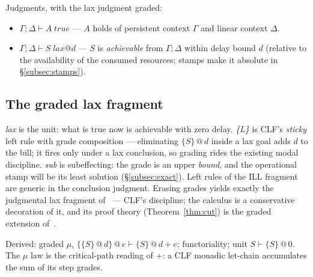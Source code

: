 \documentclass[11pt]{article}
\makeatletter
\newcommand{\lax}[2]{\{#1\}\mathbin{@}#2}       %
\newcommand{\tr}{\;\mathit{true}}                %
\newcommand{\laxjdg}[1]{\;\mathit{lax}@{#1}}    %
\theoremstyle{definition}
\theoremstyle{remark}
\makeatother
\begin{document}
Judgments, with the lax judgment graded:
\begin{itemize}
\item $\Gamma; \Delta \vdash A\tr$ --- $A$ holds of persistent context $\Gamma$
  and linear context $\Delta$.
\item $\Gamma; \Delta \vdash S\laxjdg{d}$ --- $S$ is \emph{achievable} from
  $\Gamma; \Delta$ within delay bound $d$ (relative to the availability of the
  consumed resources; stamps make it absolute in \S\ref{subsec:stamps}).
\end{itemize}

\subsection{The graded lax fragment}


\noindent\textit{lax} is the unit: what is true now is achievable with zero
delay.  \textit{\{L\}} is CLF's \emph{sticky} left rule with grade composition
--- eliminating $\lax{S}{d}$ inside a lax goal adds $d$ to the bill; it fires
only under a lax conclusion, so grading rides the existing modal discipline.
\textit{sub} is subeffecting: the grade is an upper \emph{bound}, and the
operational stamp will be its least solution (\S\ref{subsec:exact}).  Left rules
of the ILL fragment are generic in the conclusion judgment.  Erasing grades
yields exactly the judgmental lax fragment of~\cite{PfenningDavies2001} ---
CLF's discipline; the calculus is a conservative decoration of it, and its proof
theory (Theorem~\ref{thm:cut}) is the graded extension of~\cite{Iemhoff2024}.

\medskip
Derived: graded $\mu$, $\lax{\lax{S}{d}}{e} \vdash \lax{S}{d+e}$;
functoriality; unit $S \vdash \lax{S}{0}$.  The $\mu$ law is the
critical-path reading of $+$: a CLF monadic let-chain accumulates the sum of
its step grades.
\end{document}
